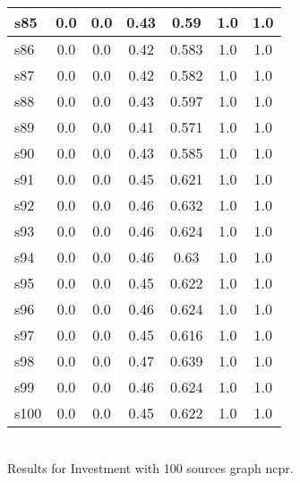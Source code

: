 \documentclass{article}
\begin{document}
\begin{tabular}{|l|c|c|c|c|c|c|}
\hline
s85 &0.0 & 0.0 & 0.43 & 0.59 & 1.0 & 1.0\\
\hline
s86 &0.0 & 0.0 & 0.42 & 0.583 & 1.0 & 1.0\\
\hline
s87 &0.0 & 0.0 & 0.42 & 0.582 & 1.0 & 1.0\\
\hline
s88 &0.0 & 0.0 & 0.43 & 0.597 & 1.0 & 1.0\\
\hline
s89 &0.0 & 0.0 & 0.41 & 0.571 & 1.0 & 1.0\\
\hline
s90 &0.0 & 0.0 & 0.43 & 0.585 & 1.0 & 1.0\\
\hline
s91 &0.0 & 0.0 & 0.45 & 0.621 & 1.0 & 1.0\\
\hline
s92 &0.0 & 0.0 & 0.46 & 0.632 & 1.0 & 1.0\\
\hline
s93 &0.0 & 0.0 & 0.46 & 0.624 & 1.0 & 1.0\\
\hline
s94 &0.0 & 0.0 & 0.46 & 0.63 & 1.0 & 1.0\\
\hline
s95 &0.0 & 0.0 & 0.45 & 0.622 & 1.0 & 1.0\\
\hline
s96 &0.0 & 0.0 & 0.46 & 0.624 & 1.0 & 1.0\\
\hline
s97 &0.0 & 0.0 & 0.45 & 0.616 & 1.0 & 1.0\\
\hline
s98 &0.0 & 0.0 & 0.47 & 0.639 & 1.0 & 1.0\\
\hline
s99 &0.0 & 0.0 & 0.46 & 0.624 & 1.0 & 1.0\\
\hline
s100 &0.0 & 0.0 & 0.45 & 0.622 & 1.0 & 1.0\\
\hline
\end{tabular}\\

\noindent Results for Investment with 100 sources graph ncpr.
\end{document}
